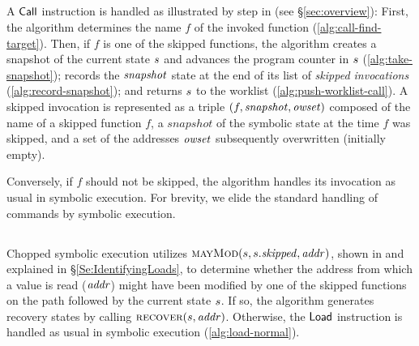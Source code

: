 \subsection{}

A $\mathsf{Call}$ instruction is handled as illustrated by step
 in  (see \S\ref{sec:overview}): First, the
algorithm determines the name $f$ of the invoked function
(\cref{alg:call-find-target}). Then, if $f$ is one of the skipped
functions, the algorithm creates a snapshot of the current state
$s$ and advances the program counter in $s$
(\cref{alg:take-snapshot}); records the $\mathit{snapshot}$ state at the end
of its list of \emph{skipped invocations}
(\cref{alg:record-snapshot}); and returns $s$ to the worklist
(\cref{alg:push-worklist-call}). A skipped invocation is represented
as a triple $(f,\mathit{snapshot},\mathit{owset})$ composed of the name of a skipped
function $f$, a $snapshot$ of the symbolic state at the time $f$ was
skipped, and a set of the addresses $\mathit{owset}$ subsequently overwritten
(initially empty).

Conversely, if $f$ should not be skipped, the algorithm handles its
invocation as usual in symbolic execution.  For brevity, we elide the
standard handling of commands by symbolic execution.

\subsection{}

Chopped symbolic execution utilizes
$\Call{mayMod}{\workstate,\workstate.\skipped,\addr}$, shown in
 and explained in
\S\ref{Se:IdentifyingLoads}, to determine whether the address from
which a value is read ($\mathit{addr}$) might have been modified by one of the
skipped functions on the path followed by the current state
$s$. If so, the algorithm generates recovery states by
calling $\Call{recover}{\workstate,\addr}$.  Otherwise, the
$\mathsf{Load}$ instruction is handled as usual in symbolic
execution (\cref{alg:load-normal}).

